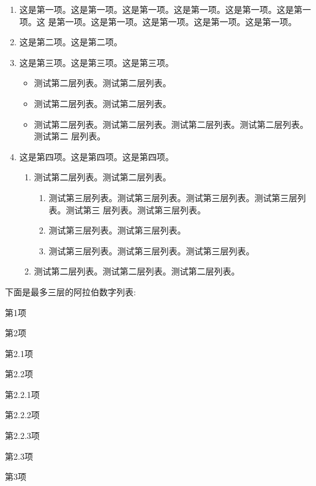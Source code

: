 \begin{enumerate}
\item 这是第一项。这是第一项。这是第一项。这是第一项。这是第一项。这是第一项。这
  是第一项。这是第一项。这是第一项。这是第一项。这是第一项。
\item 这是第二项。这是第二项。
\item 这是第三项。这是第三项。这是第三项。
  \begin{itemize}
  \item 测试第二层列表。测试第二层列表。
  \item 测试第二层列表。测试第二层列表。
  \item 测试第二层列表。测试第二层列表。测试第二层列表。测试第二层列表。测试第二
    层列表。
  \end{itemize}
\item 这是第四项。这是第四项。这是第四项。
  \begin{enumerate}
  \item 测试第二层列表。测试第二层列表。
  \begin{enumerate}
  \item 测试第三层列表。测试第三层列表。测试第三层列表。测试第三层列表。测试第三
    层列表。测试第三层列表。
  \item 测试第三层列表。测试第三层列表。
  \item 测试第三层列表。测试第三层列表。测试第三层列表。
  \end{enumerate}
  \item 测试第二层列表。测试第二层列表。测试第二层列表。
  \end{enumerate}
\end{enumerate}

下面是最多三层的阿拉伯数字列表:
\begin{arabicenum}
\item 第1项
\item 第2项
  \begin{arabicenum}
  \item 第2.1项
  \item 第2.2项
    \begin{arabicenum}
    \item 第2.2.1项
    \item 第2.2.2项
    \item 第2.2.3项
    \end{arabicenum}
  \item 第2.3项
  \end{arabicenum}
\item 第3项
\end{arabicenum}


